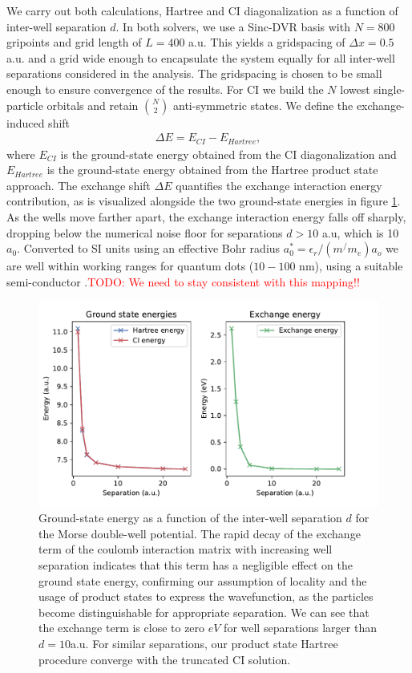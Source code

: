 \documentclass{subfiles}
\begin{document}
We carry out both calculations, Hartree and CI diagonalization as a function of inter-well separation $d$. In both solvers, we use a Sinc-DVR basis with $N=800$ gripoints and  grid length of $L=400$ a.u. This yields a gridspacing of $\Delta x = 0.5$ a.u. and a grid wide enough to encapsulate the system equally for all inter-well separations considered in the analysis. The gridspacing is chosen to be small enough to ensure convergence of the results. For CI we build the $N$ lowest single-particle orbitals and retain $\binom{N}{2}$ anti-symmetric states. We define the exchange-induced shift
\begin{align*}
    \Delta E = E_{CI} - E_{Hartree},
\end{align*}
where $E_{CI}$ is the ground-state energy obtained from the CI diagonalization and $E_{Hartree}$ is the ground-state energy obtained from the Hartree product state approach. The exchange shift $\Delta E$ quantifies the exchange interaction energy contribution, as is visualized alongside the two ground-state energies in figure \ref{fig:exchange_shift}. As the wells move farther apart, the exchange interaction energy falls off sharply, dropping below the numerical noise floor for separations $d > 10$ a.u, which is 10 $a_0$. Converted to SI units using an effective Bohr radius $a_0^* = \epsilon_r/(m^/m_e)a_o$ we are well within working ranges for quantum dots ($10-100$ nm), using a suitable semi-conductor \cite{jacak2013quantum, garcia2021semiconductor}.\textcolor{red}{TODO: We need to stay consistent with this mapping!!}
\begin{figure}[h!]
    \centering
    \includegraphics[width=1.0\textwidth]{figs/exchange_shift.pdf}
    \caption{Ground-state energy as a function of the inter-well separation $d$ for the Morse double-well potential. The rapid decay of the exchange term of the coulomb interaction matrix with increasing well separation indicates that this term has a negligible effect on the ground state energy, confirming our assumption of locality and the usage of product states to express the wavefunction, as the particles become distinguishable for appropriate separation. We can see that the exchange term is close to zero $eV$ for well separations larger than $d = 10$a.u. For similar separations, our product state Hartree procedure converge with the truncated CI solution. }
    \label{fig:exchange_shift}
\end{figure}
\end{document}
